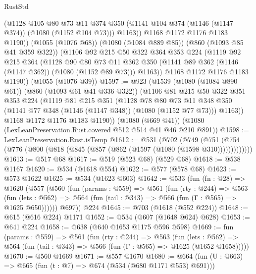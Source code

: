 \begin{lexlean}{RustStd}
\begin{coremodule}
            (@1128
              @105
              @80
              @73
              @11
              @374
              @350
              (@1141 @104 @374 (@1146 (@1147 @374)) (@1080 (@1152 @104 @73)))
              @1163))
          @1168
          @1172
          @1176
          @1183
          @1190))
      (@1055 (@1076 @68))
      (@1080 (@1084 @889 @85))
      (@860 (@1093 @85 @41 @359 @322))
      (@1106
        @92
        @215
        @50
        @322
        @364
        @353
        @224
        (@1119
          @92
          @215
          @364
          (@1128
            @90
            @80
            @73
            @11
            @362
            @350
            (@1141 @89 @362 (@1146 (@1147 @362)) (@1080 (@1152 @89 @73)))
            @1163))
        @1168
        @1172
        @1176
        @1183
        @1190))
    (@1055 (@1076 @39))
@1597 := @923
    (@1539
      (@1080 (@1084 @890 @61))
      (@860 (@1093 @61 @41 @336 @322))
      (@1106
        @81
        @215
        @50
        @322
        @351
        @353
        @224
        (@1119
          @81
          @215
          @351
          (@1128
            @78
            @80
            @73
            @11
            @348
            @350
            (@1141 @77 @348 (@1146 (@1147 @348)) (@1080 (@1152 @77 @73)))
            @1163))
        @1168
        @1172
        @1176
        @1183
        @1190))
    (@1080 (@669 @41))
    (@1080 (LexLeanPreservation.Rust.covered @512 @514 @41 @46 @210 @891))
@1598 := LexLeanPreservation.Rust.isTemp
@1612 := @531
    (@702
      (@749 (@751 (@754 (@776 (@800 (@818 (@845 (@857 (@862 (@1597 (@1080 (@1598 @310)))))))))))))
@1613 := @517 @68
@1617 := @519 (@523 @68) (@529 @68)
@1618 := @538 @1167
@1620 := @534 (@1618 @554)
@1622 := @577 (@578 @68)
@1623 := @573 @1622
@1625 := @534 (@1623 @603)
@1642 := @533
    (fun (fn : @28) =>
    @1620
      (@557
        (@560
          (fun (params : @559) =>
          @561
            (fun (rty : @244) =>
            @563
              (fun (lets : @562) =>
              @564 (fun (tail : @343) => @566 (fun (Γ : @565) => @1625 @650))))))
        @697))
    @224
@1645 := @703 (@1618 (@552 @224))
@1648 := @615 (@616 @224) @1171
@1652 := @534 (@607 (@1648 @624) @628)
@1653 := @641 @224
@1658 := @638 (@640 @1653 @1175 @596 @598)
@1669 := fun (params : @559) =>
  @561
    (fun (rty : @244) =>
    @563
      (fun (lets : @562) =>
      @564 (fun (tail : @343) => @566 (fun (Γ : @565) => @1625 (@1652 @1658)))))
@1670 := @560 @1669
@1671 := @557 @1670
@1680 := @664 (fun (U : @663) => @665 (fun (t : @7) => @674 (@534 (@680 @1171 @553) @691)))

\end{coremodule}
\end{lexlean}
